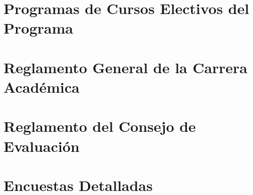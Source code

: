 \documentclass[11pt,fleqn]{book} %
\begin{document}
\section{Programas de Cursos Electivos del Programa}\label{prog_elect}


\section{Reglamento General de la Carrera Académica}\label{reg_carrera}


\section{Reglamento del Consejo de Evaluación}\label{reg_cons_eval}


\section{Encuestas Detalladas}\label{enc_det}






% 
\end{document}
